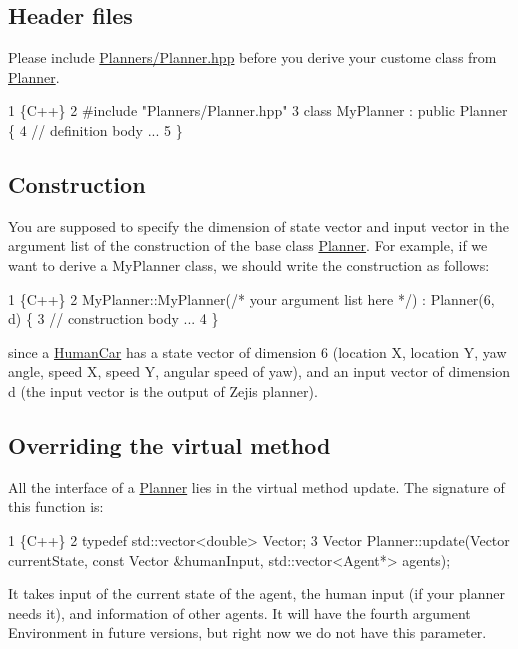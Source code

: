 \subsection*{Header files}

Please include {\ttfamily \hyperlink{Planner_8hpp_source}{Planners/\+Planner.\+hpp}} before you derive your custome class from {\ttfamily \hyperlink{classPlanner}{Planner}}. 
\begin{DoxyCode}
1 \{C++\}
2 #include "Planners/Planner.hpp"
3 class MyPlanner : public Planner \{
4     // definition body ...
5 \}
\end{DoxyCode}


\subsection*{Construction}

You are supposed to specify the dimension of {\ttfamily state} vector and {\ttfamily input} vector in the argument list of the construction of the base class {\ttfamily \hyperlink{classPlanner}{Planner}}. For example, if we want to derive a {\ttfamily My\+Planner} class, we should write the construction as follows\+: 
\begin{DoxyCode}
1 \{C++\}
2 MyPlanner::MyPlanner(/* your argument list here */) : Planner(6, d) \{
3     // construction body ...
4 \}
\end{DoxyCode}
 since a {\ttfamily \hyperlink{classHumanCar}{Human\+Car}} has a state vector of dimension 6 (location X, location Y, yaw angle, speed X, speed Y, angular speed of yaw), and an input vector of dimension d (the {\ttfamily input} vector is the output of Zeji\textquotesingle{}s planner).

\subsection*{Overriding the virtual method}

All the interface of a {\ttfamily \hyperlink{classPlanner}{Planner}} lies in the virtual method {\ttfamily update}. The signature of this function is\+: 
\begin{DoxyCode}
1 \{C++\}
2 typedef std::vector<double> Vector;
3 Vector Planner::update(Vector currentState, const Vector &humanInput, std::vector<Agent*> agents);
\end{DoxyCode}


It takes input of the current state of the agent, the human input (if your planner needs it), and information of other agents. It will have the fourth argument {\ttfamily Environment} in future versions, but right now we do not have this parameter.

